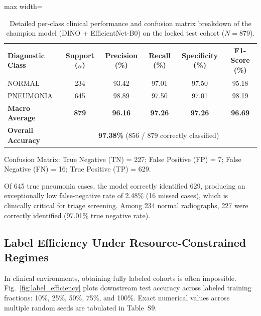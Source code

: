 \documentclass[journal,article,submit,moreauthors,pdftex]{Definitions/tsp}
\begin{document}
\begin{table}[htbp]
\tablesize{\scriptsize}
\centering
\caption{Detailed per-class clinical performance and confusion matrix breakdown of the champion model (DINO + EfficientNet-B0) on the locked test cohort ($N=879$).}
\label{tab:per_class_champion}
\begin{threeparttable}
\begin{adjustbox}{max width=\columnwidth}
\begin{tabular}{l c c c c c}
\toprule
\textbf{Diagnostic Class} & \textbf{Support ($n$)} & \textbf{Precision (\%)} & \textbf{Recall (\%)} & \textbf{Specificity (\%)} & \textbf{F1-Score (\%)} \\
\midrule
NORMAL & 234 & 93.42 & 97.01 & 97.50 & 95.18 \\
PNEUMONIA & 645 & 98.89 & 97.50 & 97.01 & 98.19 \\
\midrule
\textbf{Macro Average} & \textbf{879} & \textbf{96.16} & \textbf{97.26} & \textbf{97.26} & \textbf{96.69} \\
\textbf{Overall Accuracy} & \multicolumn{5}{c}{\textbf{97.38\%} (856 / 879 correctly classified)} \\
\bottomrule
\end{tabular}
\end{adjustbox}
\begin{tablenotes}
\item Confusion Matrix: True Negative (TN) = 227; False Positive (FP) = 7; False Negative (FN) = 16; True Positive (TP) = 629.
\end{tablenotes}
\end{threeparttable}
\end{table}

Of 645 true pneumonia cases, the model correctly identified 629, producing an exceptionally low false-negative rate of 2.48\% (16 missed cases), which is clinically critical for triage screening. Among 234 normal radiographs, 227 were correctly identified (97.01\% true negative rate).

\subsection{Label Efficiency Under Resource-Constrained Regimes} \label{sect:s4dot4}
In clinical environments, obtaining fully labeled cohorts is often impossible. Fig.~\ref{fig:label_efficiency} plots downstream test accuracy across labeled training fractions: 10\%, 25\%, 50\%, 75\%, and 100\%. Exact numerical values across multiple random seeds are tabulated in Table~S9.
\end{document}
